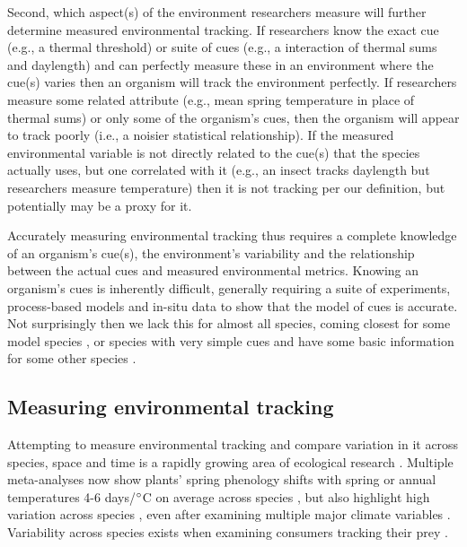 \documentclass[11pt,letterpaper]{article}
\begin{document}
Second, which aspect(s) of the environment researchers measure will further determine measured environmental tracking. If researchers know the exact cue (e.g., a thermal threshold) or suite of cues (e.g., a interaction of thermal sums and daylength) and can perfectly measure these in an environment where the cue(s) varies then an organism will track the environment perfectly. If researchers measure some related attribute (e.g., mean spring temperature in place of thermal sums) or only some of the organism's cues, then the organism will appear to track poorly (i.e., a noisier statistical relationship).  If the measured environmental variable is not directly related to the cue(s) that the species actually uses, but one correlated with it (e.g., an insect tracks daylength but researchers measure temperature) then it is not tracking per our definition, but potentially may be a proxy for it.

Accurately measuring environmental tracking thus requires a complete knowledge of an organism's cue(s), the environment's variability and the relationship between the actual cues and measured environmental metrics. Knowing an organism's cues is inherently difficult, generally requiring a suite of experiments, process-based models and in-situ data to show that the model of cues is accurate. Not surprisingly then we lack this for almost all species, coming closest for some model species \citep[e.g., \emph{Arabidopsis thaliana}][]{Kingsolver2007,Wilczek:2009oa}, or species with very simple cues \citep[e.g., coral \emph{Acropora millepora}][]{levy2007} and have some basic information for some other species \citep[e.g., the Great Tit, \emph{Parus major}][]{charm2008,chuinearees}. 

\subsection{Measuring environmental tracking}
Attempting to measure environmental tracking and compare variation in it across species, space and time is a rapidly growing area of ecological research \citep[e.g.,]{Cook:2012pnas,fu2015,thackeray2016,cohen2018}. Multiple meta-analyses now show plants' spring phenology shifts with spring or annual temperatures 4-6 days/$\degree$C on average across species \citep{Richardson:2006qh,Wolkovich:2012n,thackeray2016}, but also highlight high variation across species  \citep{Cook:2012pnas}, even after examining multiple major climate variables \citep{thackeray2016}. Variability across species exists when examining consumers tracking their prey \citep[across diverse species tracking over time is 6.1 days/decade but ranges from zero to 15 days/decade, see][]{kharouba2018}. 
\end{document}
